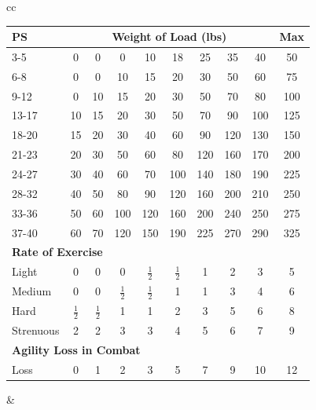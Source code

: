 \documentclass[twoside,a4paper]{article}
\begin{document}
\begin{tabular}[t]{cc}
{\fontsize{8}{11pt}\selectfont
\begin{tabular}[t]{l@{\hspace{1.8em}}c@{\hspace{1.8em}}c@{\hspace{1.8em}}c@{\hspace{1.8em}}c@{\hspace{1.8em}}c@{\hspace{1.8em}}c@{\hspace{1.8em}}c@{\hspace{1.8em}}c@{\hspace{1.8em}}c}
\textbf{PS} & \multicolumn{8}{c}{\textbf{Weight of Load (lbs)}} & \textbf{Max} \\ \hline
3-5	&0	&0	&0	&10	&18	&25	&35	&40	&50 \\ \hline
6-8	&0	&0	&10	&15	&20	&30	&50	&60	&75 \\ \hline
9-12	&0	&10	&15	&20	&30	&50	&70	&80	&100 \\ \hline
13-17	&10	&15	&20	&30	&50	&70	&90	&100	&125 \\ \hline
18-20	&15	&20	&30	&40	&60	&90	&120	&130	&150 \\ \hline
21-23	&20	&30	&50	&60	&80	&120	&160	&170	&200 \\ \hline
24-27	&30	&40	&60	&70	&100	&140	&180	&190	&225 \\ \hline
28-32	&40	&50	&80	&90	&120	&160	&200	&210	&250 \\ \hline
33-36	&50	&60	&100	&120	&160	&200	&240	&250	&275 \\ \hline
37-40	&60	&70	&120	&150	&190	&225	&270	&290	&325 \\ \hline
\multicolumn{10}{l}{\textbf{Rate of Exercise}} \\
Light	&0	&0	&0	&$\frac{1}{2}$&$\frac{1}{2}$&1	&2	&3	&5 \\ \hline
Medium	&0	&0	&$\frac{1}{2}$&$\frac{1}{2}$&1	&1	&3	&4	&6 \\ \hline
Hard	&$\frac{1}{2}$&$\frac{1}{2}$&1	&1	&2	&3	&5	&6	&8 \\ \hline
Strenuous&2	&2	&3	&3	&4	&5	&6	&7	&9 \\ \hline
\multicolumn{10}{l}{\textbf{Agility Loss in Combat}} \\
Loss	 &0	&1	&2	&3	&5	&7	&9	&10	&12 \\ \hline
\end{tabular}}
&
\begin{minipage}[t]{2.5in}
\begin{tabularx}{2.5in}[t]{cXc}

\end{tabularx}
\end{minipage}
\end{tabular}
\end{document}
